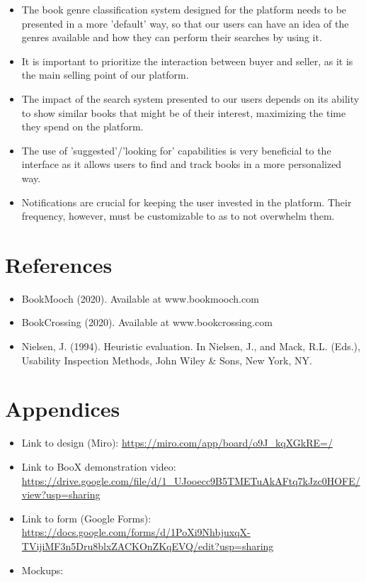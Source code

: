 \documentclass{article}
\begin{document}
\begin{itemize}
    \item The book genre classification system designed for the platform needs to be presented in a more 'default' way, so that our users can have an idea of the genres available and how they can perform their searches by using it.
    \item It is important to prioritize the interaction between buyer and seller, as it is the main selling point of our platform.
    \item The impact of the search system presented to our users depends on its ability to show similar books that might be of their interest, maximizing the time they spend on the platform.
    \item The use of 'suggested'/'looking for' capabilities is very beneficial to the interface as it allows users to find and track books in a more personalized way.
    \item Notifications are crucial for keeping the user invested in the platform. Their frequency, however, must be customizable to as to not overwhelm them.
\end{itemize}



\section{References}
\begin{itemize}
    \item BookMooch (2020). Available at www.bookmooch.com
    \item BookCrossing (2020). Available at www.bookcrossing.com
    \item Nielsen, J. (1994). Heuristic evaluation. In Nielsen, J., and Mack, R.L. (Eds.), Usability Inspection Methods, John Wiley \& Sons, New York, NY.
\end{itemize}



\section{Appendices}
\begin{itemize}
    \item Link to design (Miro): \url{https://miro.com/app/board/o9J_kqXGkRE=/}
    \item Link to BooX demonstration video: \url{https://drive.google.com/file/d/1_UJooecc9B5TMETuAkAFtq7kJzc0HOFE/view?usp=sharing}
    \item Link to form (Google Forms):
    \url{https://docs.google.com/forms/d/1PoXi9NhbjuxqX-TVijiMF3n5Dru8blxZACKOnZKqEVQ/edit?usp=sharing}
    \item Mockups: 
\end{itemize}
\end{document}
